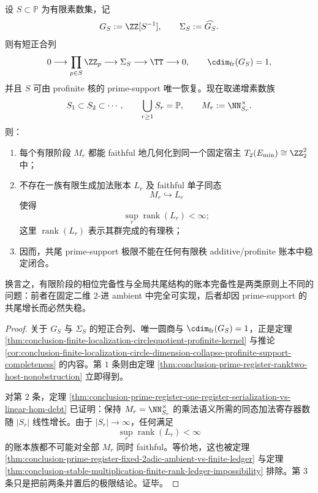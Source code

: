 \begin{theorem}\label{thm:conclusion-prime-register-finite-phase-complete-cofinal-ledger-instability}
设 \(S\subset \mathbb P\) 为有限素数集，记
\[
G_S:=\ZZ[S^{-1}],
\qquad
\Sigma_S:=\widehat{G_S}.
\]
则有短正合列
\[
0\longrightarrow \prod_{p\in S}\ZZ_p
\longrightarrow \Sigma_S
\longrightarrow \TT
\longrightarrow 0,
\qquad
\cdim_{\mathrm{fr}}(G_S)=1,
\]
并且 \(S\) 可由 profinite 核的 prime-support 唯一恢复。现在取递增素数族
\[
S_1\subset S_2\subset \cdots,
\qquad
\bigcup_{r\ge 1}S_r=\mathbb P,
\qquad
M_r:=\NN^\times_{S_r}.
\]
则：
\begin{enumerate}
\normalfont
  \item 每个有限阶段 \(M_r\) 都能 faithful 地几何化到同一个固定宿主 \(T_2(E_{\min})\cong \ZZ_2^2\) 中；
  \item 不存在一族有限生成加法账本 \(L_r\) 及 faithful 单子同态
  \[
  M_r\hookrightarrow L_r
  \]
  使得
  \[
  \sup_r \operatorname{rank}(L_r)<\infty;
  \]
  这里 \(\operatorname{rank}(L_r)\) 表示其群完成的有理秩；
  \item 因而，共尾 prime-support 极限不能在任何有限秩 additive/profinite 账本中稳定闭合。
\end{enumerate}
换言之，有限阶段的相位完备性与全局共尾结构的账本完备性是两类原则上不同的问题：前者在固定二维 \(2\)-进 ambient 中完全可实现，后者却因 prime-support 的共尾增长而必然失稳。
\end{theorem}
\begin{proof}
关于 \(G_S\) 与 \(\Sigma_S\) 的短正合列、唯一圆商与 \(\cdim_{\mathrm{fr}}(G_S)=1\)，正是定理 \ref{thm:conclusion-finite-localization-circlequotient-profinite-kernel} 与推论 \ref{cor:conclusion-finite-localization-circle-dimension-collapse-profinite-support-completeness} 的内容。第 \(1\) 条则由定理 \ref{thm:conclusion-prime-register-ranktwo-host-nonobstruction} 立即得到。

对第 \(2\) 条，定理 \ref{thm:conclusion-prime-register-one-register-serialization-vs-linear-hom-debt} 已证明：保持 \(M_r=\NN^\times_{S_r}\) 的乘法语义所需的同态加法寄存器数随 \(|S_r|\) 线性增长。由于 \(|S_r|\to\infty\)，任何满足
\[
\sup_r\operatorname{rank}(L_r)<\infty
\]
的账本族都不可能对全部 \(M_r\) 同时 faithful。等价地，这也被定理 \ref{thm:conclusion-prime-register-fixed-2adic-ambient-vs-finite-ledger} 与定理 \ref{thm:conclusion-stable-multiplication-finite-rank-ledger-impossibility} 排除。第 \(3\) 条只是把前两条并置后的极限结论。证毕。
\end{proof}

